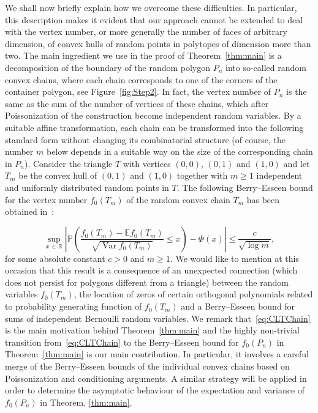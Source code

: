 \documentclass[10pt]{amsart}
\theoremstyle{definition}\newtheorem{defi}[theo]{Definition}\newtheorem{rema}[theo]{Remark}\newtheorem{exam}[theo]{Example}\newtheorem{exem}[theo]{Example}\newtheorem{nota}[theo]{Notation}
\newcommand{\var}{\operatorname{Var}}
\newcommand{\bbR}{\mathbb{R}}
\newcommand{\bbE}{\mathbb{E}}
\newcommand{\bbP}{\mathbb{P}}
\begin{document}
We shall now briefly explain how we overcome these difficulties. In particular, this description makes it evident that our approach cannot be extended to deal with the vertex number, or more generally the number of faces of arbitrary dimension, of convex hulls of random points in polytopes of dimension more than two. The main ingredient we use in the proof of Theorem~\ref{thm:main} is a decomposition of the boundary of the random polygon $P_n$ into so-called random convex chains, where each chain corresponds to one of the corners of the container polygon, see Figure~\ref{fig:Step2}. In fact, the vertex number of $P_n$ is the same as the sum of the number of vertices of these chains, which after Poissonization of the construction become independent random variables. By a suitable affine transformation, each chain can be transformed into the following standard form without changing its combinatorial structure (of course, the number $m$ below depends in a suitable way on the size of the corresponding chain in $P_n$). Consider the triangle $T$ with vertices $(0,0)$, $(0,1)$ and $(1,0)$ and let $T_m$ be the convex hull of $(0,1)$ and $(1,0)$ together with $m\geq 1$ independent and uniformly distributed random points in $T$. The following Berry--Esseen bound for the vertex number $f_0(T_m)$ of the random convex chain $T_m$ has been obtained in~\cite[Corollary~9]{GT21}:

\begin{equation}\label{eq:CLTChain}
\sup_{x\,\in\,\bbR}\left|\bbP\left(\frac{f_0(T_m)-\bbE f_0(T_m)}{\sqrt{\var f_0(T_m)}}\leq x\right)-\Phi(x)\right|\leq \frac{c}{\sqrt{\log m}},
\end{equation}
for some absolute constant $c>0$ and $m\geq 1$. We would like to mention at this occasion that this result is a consequence of an unexpected connection (which does not persist for polygons different from a triangle) between the random variables $f_0(T_m)$, the location of zeros of certain orthogonal polynomials related to probability generating function of $f_0(T_m)$ and a Berry--Esseen bound for sums of independent Bernoulli random variables. We remark that~\eqref{eq:CLTChain} is the main motivation behind Theorem~\ref{thm:main} and the highly non-trivial transition from~\eqref{eq:CLTChain} to the Berry--Esseen bound for $f_0(P_n)$ in Theorem~\ref{thm:main} is our main contribution. In particular, it involves a careful merge of the Berry--Esseen bounds of the individual convex chains based on Poissonization and conditioning arguments. A similar strategy will be applied in order to determine the asymptotic behaviour of the expectation and variance of $f_0(P_n)$ in Theorem, \ref{thm:main}.
\end{document}
